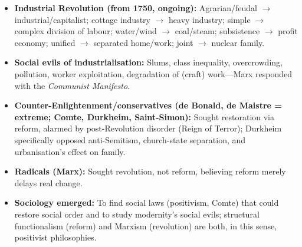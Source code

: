 \begin{QuickRevision}
\begin{itemize}
    \item \textbf{Industrial Revolution (from 1750, ongoing):} Agrarian/feudal $\rightarrow$ industrial/capitalist; cottage industry $\rightarrow$ heavy industry; simple $\rightarrow$ complex division of labour; water/wind $\rightarrow$ coal/steam; subsistence $\rightarrow$ profit economy; unified $\rightarrow$ separated home/work; joint $\rightarrow$ nuclear family.
    \item \textbf{Social evils of industrialisation:} Slums, class inequality, overcrowding, pollution, worker exploitation, degradation of (craft) work---Marx responded with the \textit{Communist Manifesto}.
    \item \textbf{Counter-Enlightenment/conservatives (de Bonald, de Maistre = extreme; Comte, Durkheim, Saint-Simon):} Sought restoration via reform, alarmed by post-Revolution disorder (Reign of Terror); Durkheim specifically opposed anti-Semitism, church-state separation, and urbanisation's effect on family.
    \item \textbf{Radicals (Marx):} Sought revolution, not reform, believing reform merely delays real change.
    \item \textbf{Sociology emerged:} To find social laws (positivism, Comte) that could restore social order and to study modernity's social evils; structural functionalism (reform) and Marxism (revolution) are both, in this sense, positivist philosophies.
\end{itemize}
\end{QuickRevision}